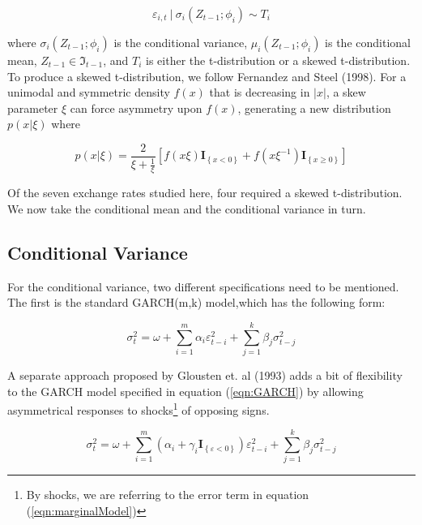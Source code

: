 \documentclass[12pt]{article}
\begin{document}
\begin{equation}
	\varepsilon_{i,t}~|~\sigma_{i}\left(Z_{t - 1}; \phi_{i}\right) \sim T_{i}
\end{equation}

where $\sigma_{i}\left(Z_{t - 1}; \phi_{i}\right)$ is the conditional variance, $\mu_{i}\left(Z_{t - 1}; \phi_{i}\right)$ is the conditional mean, $Z_{t - 1} \in \Im_{t-1}$, and $T_{i}$ is either the t-distribution or a skewed t-distribution. To produce a skewed t-distribution, we follow Fernandez and Steel (1998). For a unimodal and symmetric density $f\left(x\right)$ that is decreasing in $\left\vert x\right\vert$, a skew parameter $\xi$ can force asymmetry upon $f\left(x\right)$, generating a new distribution $p\left(x|\xi\right)$ where

\begin{equation}
	p\left(x|\xi \right) = \frac{2}{\xi + \frac{1}{\xi}} \left[f\left(x\xi\right) \mathbf{I}_{\left\{x < 0\right\}} + f\left(x\xi^{-1}\right) \mathbf{I}_{\left\{x \geq 0\right\}}\right]
\end{equation}

Of the seven exchange rates studied here, four required a skewed t-distribution. We now take the conditional mean and the conditional variance in turn. 

\subsection{Conditional Variance}

For the conditional variance, two different specifications need to be mentioned. The first is the standard GARCH(m,k) model,which has the following form:

\begin{equation} \label{eqn:GARCH}
	\sigma_{t}^{2} = \omega + \sum_{i = 1}^{m}\alpha_{i} \varepsilon_{t - i}^{2} + \sum_{j = 1}^{k}\beta_{j} \sigma_{t - j}^{2}
\end{equation}

A separate approach proposed by Glousten et. al (1993) adds a bit of flexibility to the GARCH model specified in equation (\ref{eqn:GARCH}) by allowing asymmetrical responses to shocks\footnote{By shocks, we are referring to the error term in equation (\ref{eqn:marginalModel})} of opposing signs. 

\begin{equation}
	\sigma_{t}^{2} = \omega + \sum_{i = 1}^{m}\left(\alpha_{i} + \gamma_{i}\mathbf{I}_{\left\{\varepsilon < 0 \right\}}\right) \varepsilon_{t - i}^{2} + \sum_{j = 1}^{k}\beta_{j}\sigma_{t- j}^{2}
\end{equation}
\end{document}
